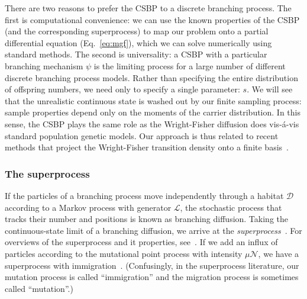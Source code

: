 \documentclass{article}
\begin{document}
There are two reasons to prefer the CSBP to a discrete branching process.
The first is computational convenience: we can use the known properties of the CSBP (and the corresponding superprocess) to map our problem onto a partial differential equation (Eq.~\ref{eq:mgf}), which we can solve numerically using standard methods.
The second is universality: a CSBP with a particular branching mechanism $\psi$ is the limiting process for a large number of different discrete branching process models.
Rather than specifying the entire distribution of offspring numbers, we need only to specify a single parameter: $s$.
We will see that the unrealistic continuous state is washed out by our finite sampling process: sample properties depend only on the moments of the carrier distribution.
In this sense, the CSBP plays the same role as the Wright-Fisher diffusion does vis-\'a-vis standard population genetic models.
Our approach is thus related to recent methods that project the Wright-Fisher transition density onto a finite basis~\cite{moments, SongSteinrucken:2012}.

\subsubsection*{The superprocess}

If the particles of a branching process move independently through a habitat $\mathcal{D}$ according to a Markov process with generator $\mathcal{L}$, the stochastic process that tracks their number and positions is known as branching diffusion.
Taking the continuous-state limit of a branching diffusion, we arrive at the \emph{superprocess}~\cite{watanabe, dawson}.
For overviews of the superprocess and it properties, see~\cite{dawson, legall, etheridge}.
If we add an influx of particles according to the mutational point process with intensity $\mu \mathcal{N}$, we have a superprocess with immigration~\cite{KawazuWatanabe:1971}.
(Confusingly, in the superprocess literature, our mutation process is called ``immigration'' and the migration process is sometimes called ``mutation''.)
\end{document}
